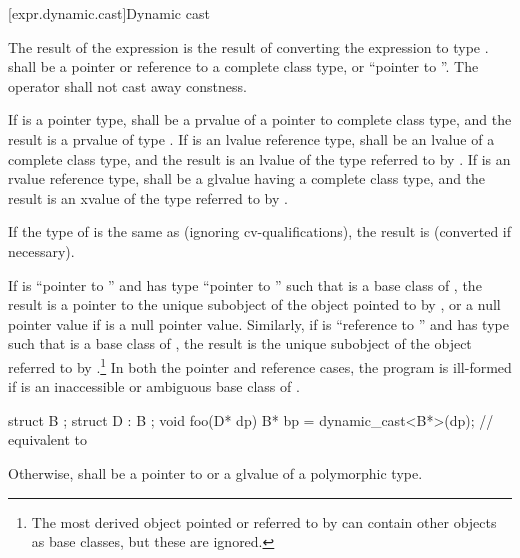 [expr.dynamic.cast]{Dynamic cast}

\pnum
{}%
%
The result of the expression  is the result of
converting the expression  to type .
%
 shall be a pointer or reference to a complete class type, or
``pointer to \cv{} ''. The  operator shall not cast
away constness.

\pnum
If  is a pointer type,  shall be a prvalue of a
pointer to complete class type, and the result is a prvalue of type
. If  is an lvalue reference type,  shall be
an lvalue of a complete class type, and the result is an lvalue of the
type referred to by . If  is an rvalue reference type,
 shall be a glvalue having a complete class type, and the
result is an xvalue of the type referred to by .

\pnum
If the type of  is the same as  (ignoring cv-qualifications),
the result is
 (converted if necessary).

\pnum
If  is ``pointer to  '' and  has
type ``pointer to  '' such that  is a base
class of , the result is a pointer to the unique 
subobject of the  object pointed to by , or
a null pointer value if  is a null pointer value.
Similarly, if
 is ``reference to  '' and  has
type   such that  is a base class of
, the result is the unique  subobject of the 
object referred to by .\footnote{The most derived
object pointed or referred to by
 can contain other  objects as base classes, but these
are ignored.}
In both the pointer and
reference cases, the program is ill-formed if  is an inaccessible or
ambiguous base class of .
\begin{example}
\begin{codeblock}
struct B { };
struct D : B { };
void foo(D* dp) {
  B*  bp = dynamic_cast<B*>(dp);    // equivalent to 
}
\end{codeblock}
\end{example}

\pnum
Otherwise,  shall be a pointer to or a glvalue of a polymorphic
type.

